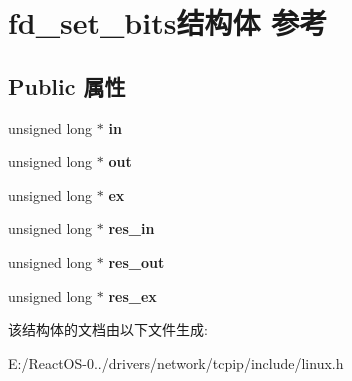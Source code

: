 \hypertarget{structfd__set__bits}{}\section{fd\+\_\+set\+\_\+bits结构体 参考}
\label{structfd__set__bits}
\subsection*{Public 属性}
\begin{DoxyCompactItemize}
\item 
\mbox{\label{structfd__set__bits_afc858db498401a42203cd252ab5d1ca1}} 
unsigned long $\ast$ {\bfseries in}
\item 
\mbox{\label{structfd__set__bits_ae0d3c2eba306273aa533122262108878}} 
unsigned long $\ast$ {\bfseries out}
\item 
\mbox{\label{structfd__set__bits_a8305877eccfd5ce39ea4a574a32d5259}} 
unsigned long $\ast$ {\bfseries ex}
\item 
\mbox{\label{structfd__set__bits_a95dca52e43fd5af0f1ecbd82e33ead1f}} 
unsigned long $\ast$ {\bfseries res\+\_\+in}
\item 
\mbox{\label{structfd__set__bits_a03d54d3e0791ccdc956f3ce2c18fc061}} 
unsigned long $\ast$ {\bfseries res\+\_\+out}
\item 
\mbox{\label{structfd__set__bits_a18330080f6df75972c4ed465c0073aea}} 
unsigned long $\ast$ {\bfseries res\+\_\+ex}
\end{DoxyCompactItemize}


该结构体的文档由以下文件生成\+:\begin{DoxyCompactItemize}
\item 
E\+:/\+React\+O\+S-\/0../drivers/network/tcpip/include/linux.\+h\end{DoxyCompactItemize}
